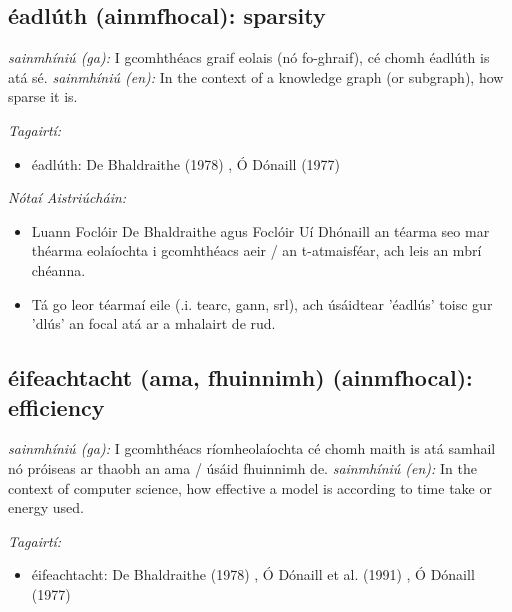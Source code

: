 \documentclass{article}
\begin{document}
\subsection*{éadlúth (ainmfhocal): sparsity} 
 \noindent \textit{sainmhíniú (ga):} I gcomhthéacs graif eolais (nó fo-ghraif), cé chomh éadlúth is atá sé.
\newline\newline
 \noindent \textit{sainmhíniú (en):} In the context of a knowledge graph (or subgraph), how sparse it is.
\newline

 \noindent \textit{Tagairtí:}
\begin{itemize}
	\item éadlúth: De Bhaldraithe (1978) \cite{de-bhaldraithe}, Ó Dónaill (1977) \cite{odonaill}
\end{itemize}

 \noindent \textit{Nótaí Aistriúcháin:}
\begin{itemize}
	\item Luann Foclóir De Bhaldraithe agus Foclóir Uí Dhónaill an téarma seo  mar théarma eolaíochta i gcomhthéacs aeir / an t-atmaisféar, ach leis an mbrí chéanna.
	\item Tá go leor téarmaí eile (.i. tearc, gann, srl), ach úsáidtear 'éadlús' toisc gur 'dlús' an focal atá ar a mhalairt de rud.
\end{itemize}


\subsection*{éifeachtacht (ama, fhuinnimh) (ainmfhocal): efficiency} 
 \noindent \textit{sainmhíniú (ga):} I gcomhthéacs ríomheolaíochta cé chomh maith is atá samhail nó próiseas ar thaobh an ama / úsáid fhuinnimh de.
\newline\newline
 \noindent \textit{sainmhíniú (en):} In the context of computer science, how effective a model is according to time take or energy used.
\newline

 \noindent \textit{Tagairtí:}
\begin{itemize}
	\item éifeachtacht: De Bhaldraithe (1978) \cite{de-bhaldraithe}, Ó Dónaill et al. (1991) \cite{focloir-beag}, Ó Dónaill (1977) \cite{odonaill}
\end{itemize}
\end{document}
